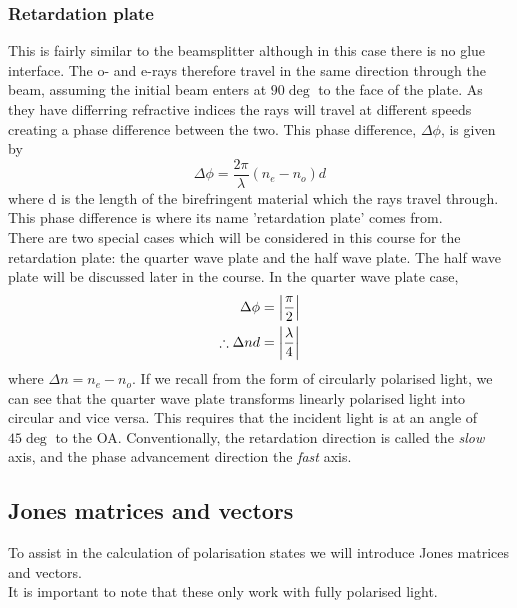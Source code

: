 \subsubsection{Retardation plate}
This is fairly similar to the beamsplitter although in this case there is no glue interface.
The o- and e-rays therefore travel in the same direction through the beam, assuming the initial beam enters at \(90\deg\) to the face of the plate. 
As they have differring refractive indices the rays will travel at different speeds creating a phase difference between the two.
This phase difference, \(\Delta\phi\), is given by 
\begin{equation}
\Delta\phi = \frac{2\pi}{\lambda}\left(n_e - n_o\right)d
\label{eq:ItP:phase_difference}
\end{equation}
where d is the length of the birefringent material which the rays travel through.
This phase difference is where its name 'retardation plate' comes from.
\\
There are two special cases which will be considered in this course for the retardation plate: the quarter wave plate and the half wave plate.
The half wave plate will be discussed later in the course.
In the quarter wave plate case, 
\begin{align*}
\Delta\phi &= \abs{\frac{\pi}{2}} \\
 \therefore \Delta{nd} &=\abs{\frac{\lambda}{4}} 
\end{align*}
where \(\Delta{n} = n_e-n_o\).
If we recall from the form of circularly polarised light, we can see that the quarter wave plate transforms linearly polarised light into circular and vice versa. 
This requires that the incident light is at an angle of \(45\deg\) to the OA. 
Conventionally, the retardation direction is called the \emph{slow} axis, and the phase advancement direction the \emph{fast} axis.
 
\subsection{Jones matrices and vectors}
To assist in the calculation of polarisation states we will introduce Jones matrices and vectors. 
\\
It is important to note that these only work with fully polarised light.
\\

